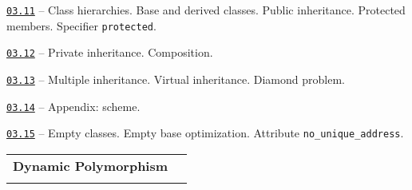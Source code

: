\documentclass[a4paper,12pt]{article}
\renewenvironment{itemize}
{
    \begin{list}{\labelitemi}
    {
      \setlength{\topsep}{0pt}
      \setlength{\partopsep}{0pt}
      \setlength{\parskip}{0pt}
      \setlength{\itemsep}{0pt}
      \setlength{\parsep}{0pt}
      \setlength{\leftmargin}{14.5pt}
    }
}{\end{list}}
\begin{document}
\begin{itemize}

    \item \href{https://github.com/i-s-m-mipt/Education/blob/master/projects/examples/source/03.11.cpp}{\texttt{03.11}} -- Class hierarchies. Base and derived classes. Public inheritance. Protected members. Specifier \lstinline{protected}.

    \smallskip

    \item \href{https://github.com/i-s-m-mipt/Education/blob/master/projects/examples/source/03.12.cpp}{\texttt{03.12}} -- Private inheritance. Composition.

    \smallskip

    \item \href{https://github.com/i-s-m-mipt/Education/blob/master/projects/examples/source/03.13.cpp}{\texttt{03.13}} -- Multiple inheritance. Virtual inheritance. Diamond problem.

    \smallskip

    \item \href{https://github.com/i-s-m-mipt/Education/blob/master/projects/examples/source/03.14.pdf}{\texttt{03.14}} -- Appendix: scheme.

    \smallskip

    \item \href{https://github.com/i-s-m-mipt/Education/blob/master/projects/examples/source/03.15.cpp}{\texttt{03.15}} -- Empty classes. Empty base optimization. Attribute \lstinline{no_unique_address}.

\end{itemize}

\bigskip\medskip

\begin{tabular}{!{\vrule width 1pt}L{4.7cm}!{\vrule width 1pt}L{14.3cm}!{\vrule width 0pt}} 


\textbf{Dynamic Polymorphism} & \\


\end{tabular}

\medskip\smallskip
\end{document}
